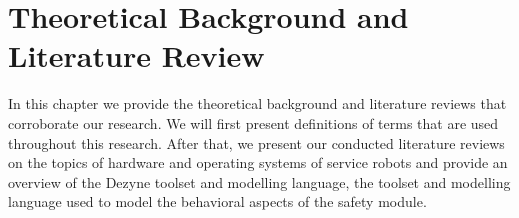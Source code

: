 \documentclass[12pt]{scrreprt}
\begin{document}
\chapter{Theoretical Background and Literature Review}
In this chapter we provide the theoretical background and literature reviews that corroborate our research. We will first present definitions of terms that are used throughout this research. After that, we present our conducted literature reviews on the topics of hardware and operating systems of service robots and provide an overview of the Dezyne toolset and modelling language, the toolset and modelling language used to model the behavioral aspects of the safety module.
\label{Theoretical Background}

\end{document}
